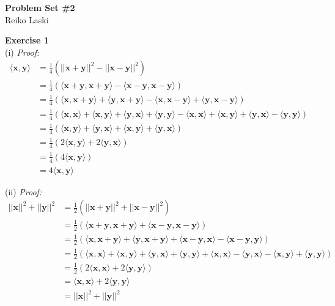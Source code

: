 \documentclass[letterpaper,12pt]{article}
\let\vec\mathbf
\theoremstyle{definition}
\begin{document}
\begin{flushleft}
  \textbf{\large{Problem Set \#2}} \\
  Reiko Laski
\end{flushleft}

\textbf{Exercise 1} \\
(i) \textit{Proof:}
\begin{align*}
  \langle \vec{x}, \vec{y} \rangle &= \frac{1}{4}(||\vec{x} + \vec{y}||^2 - ||\vec{x} - \vec{y}||^2) \\
  &= \frac{1}{4} (\langle \vec{x} + \vec{y}, \vec{x} + \vec{y}\rangle - \langle \vec{x} - \vec{y}, \vec{x} - \vec{y}\rangle) \\
  &= \frac{1}{4} (\langle \vec{x}, \vec{x} + \vec{y}\rangle + \langle \vec{y}, \vec{x} + \vec{y}\rangle - \langle \vec{x}, \vec{x} - \vec{y}\rangle + \langle \vec{y}, \vec{x} - \vec{y}\rangle) \\
  &= \frac{1}{4} (\langle \vec{x}, \vec{x}\rangle + \langle \vec{x}, \vec{y}\rangle + \langle \vec{y}, \vec{x}\rangle + \langle \vec{y}, \vec{y}\rangle - \langle \vec{x}, \vec{x}\rangle + \langle \vec{x}, \vec{y}\rangle + \langle \vec{y}, \vec{x}\rangle - \langle \vec{y}, \vec{y}\rangle) \\
  &= \frac{1}{4} (\langle \vec{x}, \vec{y}\rangle + \langle \vec{y}, \vec{x}\rangle + \langle \vec{x}, \vec{y}\rangle + \langle \vec{y}, \vec{x}\rangle) \\
  &= \frac{1}{4} (2\langle \vec{x}, \vec{y} \rangle + 2\langle \vec{y}, \vec{x} \rangle) \\
  &= \frac{1}{4} (4\langle \vec{x}, \vec{y} \rangle) \\
  &= 4\langle \vec{x}, \vec{y} \rangle
\end{align*}

(ii) \textit{Proof:}
\begin{align*}
  ||\vec{x}||^2 + ||\vec{y}||^2 &= \frac{1}{2}(||\vec{x} + \vec{y}||^2 + ||\vec{x} - \vec{y}||^2) \\
  &= \frac{1}{2} (\langle \vec{x} + \vec{y}, \vec{x} + \vec{y} \rangle + \langle \vec{x} - \vec{y}, \vec{x} - \vec{y} \rangle) \\
  &= \frac{1}{2} (\langle \vec{x}, \vec{x} + \vec{y} \rangle + \langle \vec{y}, \vec{x} + \vec{y} \rangle + \langle \vec{x} - \vec{y}, \vec{x} \rangle - \langle \vec{x} - \vec{y}, \vec{y} \rangle) \\
  &= \frac{1}{2} (\langle \vec{x}, \vec{x} \rangle + \langle \vec{x}, \vec{y} \rangle + \langle \vec{y}, \vec{x} \rangle + \langle \vec{y}, \vec{y} \rangle + \langle \vec{x}, \vec{x} \rangle - \langle \vec{y}, \vec{x} \rangle - \langle \vec{x}, \vec{y} \rangle + \langle \vec{y}, \vec{y} \rangle) \\
  &= \frac{1}{2} (2\langle \vec{x}, \vec{x} \rangle + 2 \langle \vec{y}, \vec{y} \rangle) \\
  &= \langle \vec{x}, \vec{x} \rangle + 2 \langle \vec{y}, \vec{y} \rangle \\
  &= ||\vec{x}||^2 + ||\vec{y}||^2
\end{align*}
\end{document}
